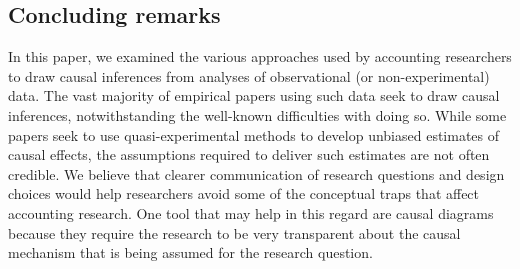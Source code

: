 \documentclass[12pt,reqno,titlepage]{amsart}
\theoremstyle{definition}
\begin{document}
\begin{doublespace}



\section{Concluding remarks} \label{sec:conclude}
In this paper, we examined the various approaches used by accounting researchers to draw causal inferences from analyses of observational (or non-experimental) data. 
The vast majority of empirical papers using such data seek to draw causal inferences, notwithstanding the well-known difficulties with doing so.
While some papers seek to use quasi-experimental methods to develop unbiased estimates of causal effects, the assumptions required to deliver such estimates are not often credible. 
We believe that clearer communication of research questions and design choices would help researchers avoid some of the conceptual traps that affect 
accounting research.
One tool that may help in this regard are causal diagrams because they require the research to be very transparent about the causal mechanism that is being assumed for the research question.


\end{doublespace}
\end{document}
